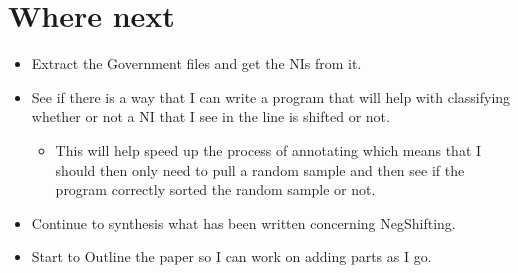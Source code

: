 \documentclass[12pt, letterpaper]{article}
\begin{document}
\section*{Where next}
\begin{itemize}
	\item Extract the Government files and get the NIs from it.
	\item See if there is a way that I can write a program that will help with classifying whether or not a NI that I see in the line is shifted or not.
	\begin{itemize}
		\item This will help speed up the process of annotating which means that I should then only need to pull a random sample and then see if the program correctly sorted the random sample or not.
	\end{itemize}
	\item Continue to synthesis what has been written concerning NegShifting.
	\item Start to Outline the paper so I can work on adding parts as I go.
\end{itemize}



\printbibliography

\end{document}

